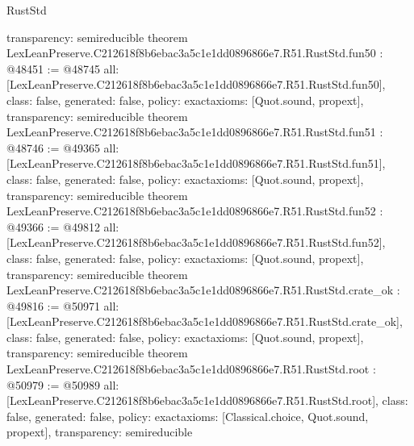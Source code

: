 \begin{lexlean}{RustStd}
\begin{coremodule}
{  transparency: semireducible
}
theorem LexLeanPreserve.C212618f8b6ebac3a5c1e1dd0896866e7.R51.RustStd.fun50 : @48451 := @48745 {
  all: [LexLeanPreserve.C212618f8b6ebac3a5c1e1dd0896866e7.R51.RustStd.fun50],
  class: false,
  generated: false,
  policy: exact{axioms: [Quot.sound, propext]},
  transparency: semireducible
}
theorem LexLeanPreserve.C212618f8b6ebac3a5c1e1dd0896866e7.R51.RustStd.fun51 : @48746 := @49365 {
  all: [LexLeanPreserve.C212618f8b6ebac3a5c1e1dd0896866e7.R51.RustStd.fun51],
  class: false,
  generated: false,
  policy: exact{axioms: [Quot.sound, propext]},
  transparency: semireducible
}
theorem LexLeanPreserve.C212618f8b6ebac3a5c1e1dd0896866e7.R51.RustStd.fun52 : @49366 := @49812 {
  all: [LexLeanPreserve.C212618f8b6ebac3a5c1e1dd0896866e7.R51.RustStd.fun52],
  class: false,
  generated: false,
  policy: exact{axioms: [Quot.sound, propext]},
  transparency: semireducible
}
theorem LexLeanPreserve.C212618f8b6ebac3a5c1e1dd0896866e7.R51.RustStd.crate_ok : @49816 := @50971 {
  all: [LexLeanPreserve.C212618f8b6ebac3a5c1e1dd0896866e7.R51.RustStd.crate_ok],
  class: false,
  generated: false,
  policy: exact{axioms: [Quot.sound, propext]},
  transparency: semireducible
}
theorem LexLeanPreserve.C212618f8b6ebac3a5c1e1dd0896866e7.R51.RustStd.root : @50979 := @50989 {
  all: [LexLeanPreserve.C212618f8b6ebac3a5c1e1dd0896866e7.R51.RustStd.root],
  class: false,
  generated: false,
  policy: exact{axioms: [Classical.choice, Quot.sound, propext]},
  transparency: semireducible
}


\end{coremodule}
\end{lexlean}
